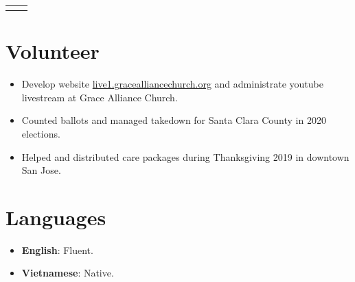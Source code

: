\documentclass[11pt]{article} %
\begin{document}
\begin{paracol}{2}




\begin{supertabular}{rl} %
	
	
	
	
	
\end{supertabular}


\medskip %

\section{Volunteer} 
\begin{itemize}
	\setlength\itemsep{-0.5em}
    \item Develop website \href{http://live1.gracealliancechurch.org/}{live1.gracealliancechurch.org} and administrate youtube livestream at Grace Alliance Church.
    \item Counted ballots and managed takedown for Santa Clara County in 2020 elections.
    \item Helped and distributed care packages during Thanksgiving 2019 in downtown San Jose.
\end{itemize}


\section{Languages} 
\begin{itemize}
	\setlength\itemsep{-0.5em}
    \item \textbf{English}: Fluent.
    \item \textbf{Vietnamese}: Native.
\end{itemize}


\end{paracol}

\end{document}
